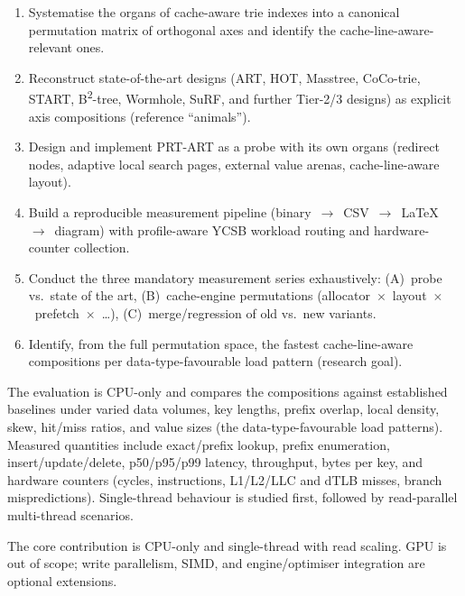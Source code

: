 \begin{enumerate}
  \item Systematise the organs of cache-aware trie indexes into a canonical
        permutation matrix of orthogonal axes and identify the cache-line-aware-relevant
        ones.
  \item Reconstruct state-of-the-art designs (ART, HOT, Masstree, CoCo-trie,
        START, B\textsuperscript{2}-tree, Wormhole, SuRF, and further Tier-2/3
        designs) as explicit axis compositions (reference ``animals'').
  \item Design and implement PRT-ART as a probe with its own organs (redirect
        nodes, adaptive local search pages, external value arenas,
        cache-line-aware layout).
  \item Build a reproducible measurement pipeline
        (binary~$\to$~CSV~$\to$~LaTeX~$\to$~diagram) with profile-aware YCSB
        workload routing and hardware-counter collection.
  \item Conduct the three mandatory measurement series exhaustively: (A)~probe
        vs.\ state of the art, (B)~cache-engine permutations
        (allocator~$\times$~layout~$\times$~prefetch~$\times$~\ldots),
        (C)~merge/regression of old vs.\ new variants.
  \item Identify, from the full permutation space, the fastest cache-line-aware
        compositions per data-type-favourable load pattern (research goal).
\end{enumerate}

The evaluation is CPU-only and compares the compositions against established
baselines under varied data volumes, key lengths, prefix overlap, local density,
skew, hit/miss ratios, and value sizes (the data-type-favourable load patterns).
Measured quantities include exact/prefix lookup, prefix enumeration,
insert/update/delete, p50/p95/p99 latency, throughput, bytes per key, and
hardware counters (cycles, instructions, L1/L2/LLC and dTLB misses, branch
mispredictions). Single-thread behaviour is studied first, followed by
read-parallel multi-thread scenarios.

The core contribution is CPU-only and single-thread with read scaling. GPU is
out of scope; write parallelism, SIMD, and engine/optimiser integration are
optional extensions.
